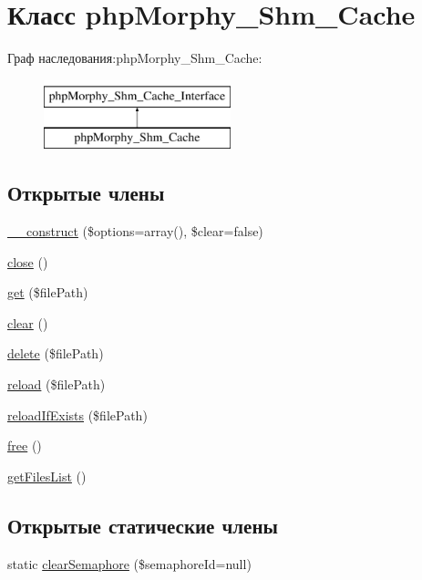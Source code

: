 \hypertarget{classphpMorphy__Shm__Cache}{
\section{Класс phpMorphy\_\-Shm\_\-Cache}
\label{classphpMorphy__Shm__Cache}
}
Граф наследования:phpMorphy\_\-Shm\_\-Cache:\begin{figure}[H]
\begin{center}
\leavevmode
\includegraphics[height=2.000000cm]{classphpMorphy__Shm__Cache}
\end{center}
\end{figure}
\subsection*{Открытые члены}
\begin{DoxyCompactItemize}
\item 
\hyperlink{classphpMorphy__Shm__Cache_ac382d7b453b0f857112b49168bd01f57}{\_\-\_\-construct} (\$options=array(), \$clear=false)
\item 
\hyperlink{classphpMorphy__Shm__Cache_a1c6bd207c514629bc4dec628798964bc}{close} ()
\item 
\hyperlink{classphpMorphy__Shm__Cache_aeb522fa99345a875738497f065aecbf7}{get} (\$filePath)
\item 
\hyperlink{classphpMorphy__Shm__Cache_aed912ca62b148800a0aab43e393f4616}{clear} ()
\item 
\hyperlink{classphpMorphy__Shm__Cache_aa79aa72a7245606f0f76ae50db68f653}{delete} (\$filePath)
\item 
\hyperlink{classphpMorphy__Shm__Cache_a1b404d051ef44923531774cbf417fabb}{reload} (\$filePath)
\item 
\hyperlink{classphpMorphy__Shm__Cache_a9b91c4754ca194f2ee7f6b9a98a8fced}{reloadIfExists} (\$filePath)
\item 
\hyperlink{classphpMorphy__Shm__Cache_aec1e489cf56452a5a7a4f02092fd5b98}{free} ()
\item 
\hyperlink{classphpMorphy__Shm__Cache_a614e21104de6c14436a71923aa4aa28a}{getFilesList} ()
\end{DoxyCompactItemize}
\subsection*{Открытые статические члены}
\begin{DoxyCompactItemize}
\item 
static \hyperlink{classphpMorphy__Shm__Cache_a7a6974dbfbfe3dae4a1bd6679e992d4a}{clearSemaphore} (\$semaphoreId=null)
\end{DoxyCompactItemize}

